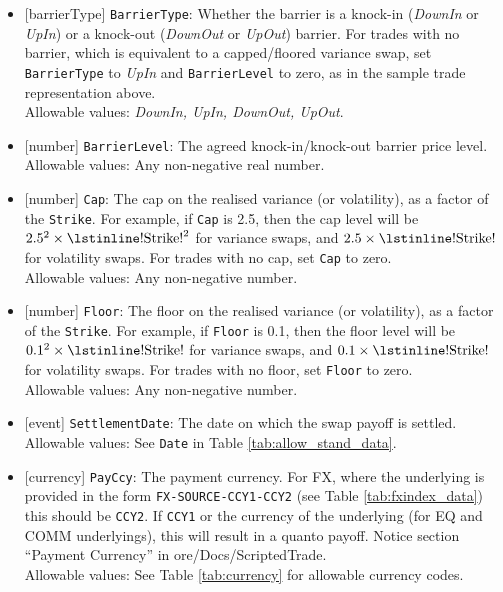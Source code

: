 \begin{itemize}
  \item{}[barrierType] \lstinline!BarrierType!: Whether the barrier is a knock-in (\emph{DownIn} or \emph{UpIn}) or a knock-out
  (\emph{DownOut} or \emph{UpOut}) barrier. For trades with no barrier, which is equivalent to a capped/floored
  variance swap, set \lstinline!BarrierType! to \emph{UpIn} and \lstinline!BarrierLevel! to zero, as in the sample trade
  representation above. \\
  Allowable values: \emph{DownIn, UpIn, DownOut, UpOut}.
  \item{}[number] \lstinline!BarrierLevel!: The agreed knock-in/knock-out barrier price level. \\
  Allowable values: Any non-negative real number.
  \item{}[number] \lstinline!Cap!: The cap on the realised variance (or volatility), as a factor of the \lstinline!Strike!. For example,
  if \lstinline!Cap! is 2.5, then the cap level will be $2.5^2 \times \text{\lstinline!Strike!}^2$ for variance swaps, and
  $2.5 \times \text{\lstinline!Strike!}$ for volatility swaps. For trades with no cap, set \lstinline!Cap! to zero. \\
  Allowable values: Any non-negative number.
  \item{}[number] \lstinline!Floor!: The floor on the realised variance (or volatility), as a factor of the \lstinline!Strike!. For example,
  if \lstinline!Floor! is 0.1, then the floor level will be $0.1^2 \times \text{\lstinline!Strike!}$ for variance swaps, and
  $0.1 \times \text{\lstinline!Strike!}$ for volatility swaps. For trades with no floor, set
  \lstinline!Floor! to zero. \\
  Allowable values: Any non-negative number.
  \item{}[event] \lstinline!SettlementDate!: The date on which the swap payoff is settled. \\
  Allowable values: See \lstinline!Date! in Table \ref{tab:allow_stand_data}.
  \item{}[currency] \lstinline!PayCcy!: The payment currency. For FX, where the underlying is provided
      in the form \lstinline!FX-SOURCE-CCY1-CCY2! (see Table \ref{tab:fxindex_data}) this should
      be \lstinline!CCY2!. If \lstinline!CCY1! or the currency of the underlying (for EQ and
      COMM underlyings), this will result in a quanto payoff. Notice section ``Payment Currency'' in ore/Docs/ScriptedTrade. \\
        Allowable values: See Table \ref{tab:currency} for allowable currency codes.
\end{itemize}

